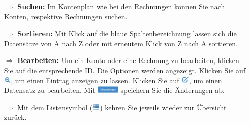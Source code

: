 \documentclass{article}
\begin{document}
\begin{multicols}{2}
\begin{tcolorbox}[colback=blue!5,colframe=blue!40!black,title=Weitere Funktionen im Controlling]
\begin{itemize}
  \item[$\Longrightarrow$] \textbf{Suchen:} Im Kontenplan wie bei den Rechnungen können Sie nach Konten, respektive Rechnungen suchen.
  \item[$\Longrightarrow$] \textbf{Sortieren:} Mit Klick auf die blaue Spaltenbezeichnung lassen sich die Datensätze von A nach Z oder mit erneutem Klick von Z nach A sortieren.
  \item[$\Longrightarrow$] \textbf{Bearbeiten:} Um ein Konto oder eine Rechnung zu bearbeiten, klicken Sie auf die entsprechende ID. Die Optionen werden angezeigt. Klicken Sie auf \includegraphics[height=10pt]{Icons/Lupe.jpg}, um einen Eintrag anzeigen zu lassen. Klicken Sie auf \includegraphics[height=10pt]{Icons/bearbeiten.jpg}, um einen Datensatz zu bearbeiten. Mit \includegraphics[height=10pt]{Icons/B_Uebernehmen.jpg} speichern Sie die Änderungen ab.
	\item[$\Longrightarrow$] Mit dem Listensymbol (\includegraphics[height=10pt]{Icons/Listensymbol_zurueck.jpg}) kehren Sie jeweils wieder zur Übersicht zurück.
\end{itemize}
\end{tcolorbox}


\end{multicols}



\pagebreak


\vspace{\baselineskip}


\end{document}
